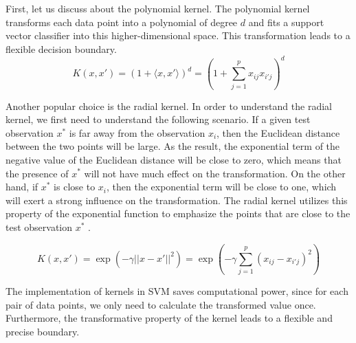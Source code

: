 First, let us discuss about the polynomial kernel. The polynomial kernel transforms each data point into a polynomial
of degree $d$ and fits a support vector classifier into this higher-dimensional space. This 
transformation leads to a flexible decision boundary. 
\begin{equation}
    K(x, x') = (1 + \langle x, x' \rangle)^d = (1 + \sum_{j=1}^px_{ij}x_{i'j})^d
\end{equation}

Another popular choice is the radial kernel. In order to understand the radial kernel, we first need to understand
the following scenario.
If a given test observation $x^*$ is far away from the observation $x_i$,
then the Euclidean distance between the two points will be large.
As the result, the exponential term of the negative value of the Euclidean distance will be close to zero,
which means that the presence of $x^*$ will not have much effect on the transformation.
On the other hand, if $x^*$ is close to $x_i$, then the exponential term will be close to one, which
will exert a strong influence on the transformation. The radial kernel utilizes this property of the
exponential function to emphasize the points that are close to the test observation $x^*$ \cite{R9}.

\begin{equation}
    K(x, x') = \exp(-\gamma ||x - x'||^2) = \exp(-\gamma \sum_{j=1}^p(x_{ij} - x_{i'j})^2)
\end{equation}

The implementation of kernels in SVM saves computational power, since for each pair of data points, we
only need to calculate the transformed value once. Furthermore, the transformative property of the
kernel leads to a flexible and precise boundary. \cite{R9}
